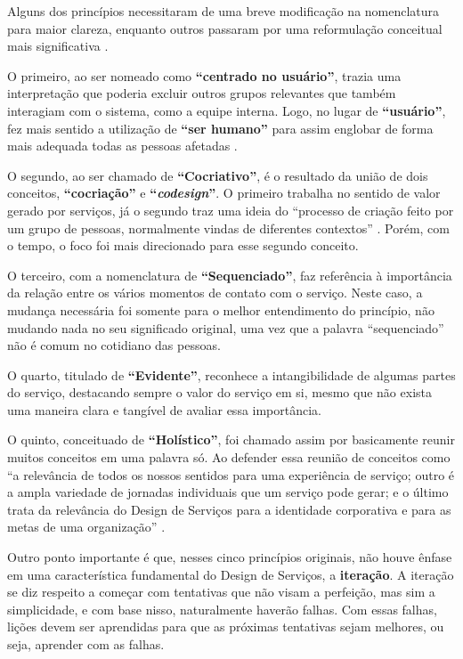 Alguns dos princípios necessitaram de uma breve modificação na nomenclatura para maior clareza, enquanto outros passaram por uma reformulação conceitual mais significativa \cite{Stickdorn2019}.

O primeiro, ao ser nomeado como \textbf{``centrado no usuário''}, trazia uma interpretação que poderia excluir outros grupos relevantes que também interagiam com o sistema, como a equipe interna. Logo, no lugar de \textbf{``usuário''}, fez mais sentido a utilização de \textbf{``ser humano''} para assim englobar de forma mais adequada todas as pessoas afetadas \cite{Stickdorn2019}.

O segundo, ao ser chamado de \textbf{``Cocriativo''}, é o resultado da união de dois conceitos, \textbf{``cocriação''} e \textbf{``\textit{codesign}''}. O primeiro trabalha no sentido de valor gerado por serviços, já o segundo traz uma ideia do ``processo de criação feito por um grupo de pessoas, normalmente vindas de diferentes contextos'' \cite{Stickdorn2019}. Porém, com o tempo, o foco foi mais direcionado para esse segundo conceito.

O terceiro, com a nomenclatura de \textbf{``Sequenciado''}, faz referência à importância da relação entre os vários momentos de contato com o serviço. Neste caso, a mudança necessária foi somente para o melhor entendimento do princípio, não mudando nada no seu significado original, uma vez que a palavra ``sequenciado'' não é comum no cotidiano das pessoas.

O quarto, titulado de \textbf{``Evidente''}, reconhece a intangibilidade de algumas partes do serviço, destacando sempre o valor do serviço em si, mesmo que não exista uma maneira clara e tangível de avaliar essa importância.

O quinto, conceituado de \textbf{``Holístico''}, foi chamado assim por basicamente reunir muitos conceitos em uma palavra só. Ao defender essa reunião de conceitos como ``a relevância de todos os nossos sentidos para uma experiência de serviço; outro é a ampla variedade de jornadas individuais que um serviço pode gerar; e o último trata da relevância do Design de Serviços para a identidade corporativa e para as metas de uma organização'' \cite{Stickdorn2019}.

Outro ponto importante é que, nesses cinco princípios originais, não houve ênfase em uma característica fundamental do Design de Serviços, a \textbf{iteração}. A iteração se diz respeito a começar com tentativas que não visam a perfeição, mas sim a simplicidade, e com base nisso, naturalmente haverão falhas. Com essas falhas, lições devem ser aprendidas para que as próximas tentativas sejam melhores, ou seja, aprender com as falhas.

